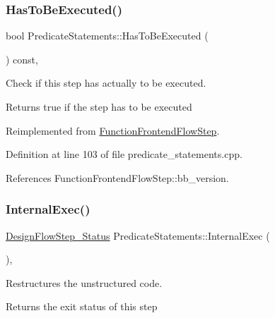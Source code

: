 \subsubsection{\texorpdfstring{Has\+To\+Be\+Executed()}{HasToBeExecuted()}}
{\footnotesize\ttfamily bool Predicate\+Statements\+::\+Has\+To\+Be\+Executed (\begin{DoxyParamCaption}{ }\end{DoxyParamCaption}) const\hspace{0.3cm}{\ttfamily [override]}, {\ttfamily [virtual]}}



Check if this step has actually to be executed. 

\begin{DoxyReturn}{Returns}
true if the step has to be executed 
\end{DoxyReturn}


Reimplemented from \hyperlink{classFunctionFrontendFlowStep_a12e786363530aa9533e4bd9380130d75}{Function\+Frontend\+Flow\+Step}.



Definition at line 103 of file predicate\+\_\+statements.\+cpp.



References Function\+Frontend\+Flow\+Step\+::bb\+\_\+version.

\mbox{\label{classPredicateStatements_aa2e79d8893443b3126d0e356aeb7f924}} 
\subsubsection{\texorpdfstring{Internal\+Exec()}{InternalExec()}}
{\footnotesize\ttfamily \hyperlink{design__flow__step_8hpp_afb1f0d73069c26076b8d31dbc8ebecdf}{Design\+Flow\+Step\+\_\+\+Status} Predicate\+Statements\+::\+Internal\+Exec (\begin{DoxyParamCaption}{ }\end{DoxyParamCaption})\hspace{0.3cm}{\ttfamily [override]}, {\ttfamily [virtual]}}



Restructures the unstructured code. 

\begin{DoxyReturn}{Returns}
the exit status of this step 
\end{DoxyReturn}


